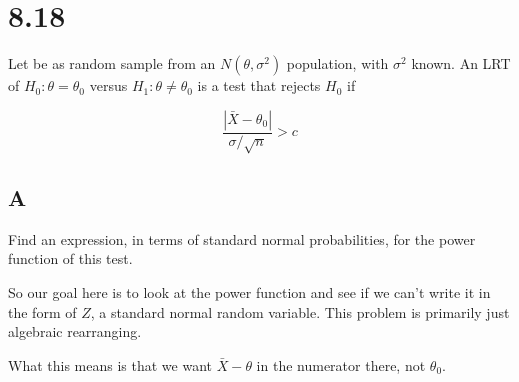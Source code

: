 \section{8.18}

Let \rs be as random sample from an $N(\theta, \sigma^2)$ population, with $\sigma^2$ known. An LRT of $H_0: \theta = \theta_0$ versus $H_1: \theta \neq \theta_0$ is a test that rejects $H_0$ if

\[
	\frac{|\bar{X} - \theta_0|}{\sigma / \sqrt{n}} > c
\]

\subsection{A}

Find an expression, in terms of standard normal probabilities, for the power function of this test. 

So our goal here is to look at the power function and see if we can't write it in the form of $Z$, a standard normal random variable. This problem is primarily just algebraic rearranging.

What this means is that we want $\bar{X} - \theta$ in the numerator there, not $\theta_0$. 

